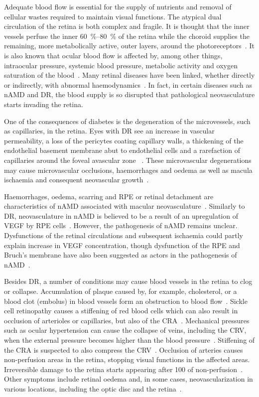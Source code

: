 \documentclass{article}
\begin{document}
Adequate blood flow is essential for the supply of nutrients and removal of cellular wastes required to maintain visual functions.
The atypical dual circulation of the retina is both complex and fragile.
It is thought that the inner vessels perfuse the inner \SIrange{60}{80}{\percent} of the retina while the choroid supplies the remaining, more metabolically active, outer layers, around the photoreceptors~\cite{Birol_2007}.
It is also known that ocular blood flow is affected by, among other things, intraocular pressure, systemic blood pressure, metabolic activity and oxygen saturation of the blood~\cite{Birol_2007,McCullough_1997,Palkovits_2014,Polska_2007,Pournaras_2008,Riva_1997,Wang_2014}.
Many retinal diseases have been linked, whether directly or indirectly, with abnormal haemodynamics~\cite{Hayreh_2004,Medina_2016}.
In fact, in certain diseases such as nAMD and DR, the blood supply is so disrupted that pathological neovasculature starts invading the retina.

One of the consequences of diabetes is the degeneration of the microvessels, such as capillaries, in the retina.
Eyes with DR see an increase in vascular permeability, a loss of the pericytes coating capillary walls, a thickening of the endothelial basement membrane abut to endothelial cells and a rarefaction of capillaries around the foveal avascular zone ~\cite{Medina_2016}.
These microvascular degenerations may cause microvascular occlusions, haemorrhages and oedema as well as macula ischaemia and consequent neovascular growth~\cite{Medina_2016}.

Haemorrhages, oedema, scarring and RPE or retinal detachment are characteristics of nAMD associated with macular neovasculature~\cite{Gupta_2015,Jager_2008}.
Similarly to DR, neovasculature in nAMD is believed to be a result of an upregulation of VEGF by RPE cells~\cite{Jager_2008}.
However, the pathogenesis of nAMD remains unclear.
Dysfunctions of the retinal circulations and subsequent ischaemia could partly explain increase in VEGF concentration, though dysfunction of the RPE and Bruch's membrane have also been suggested as actors in the pathogenesis of nAMD~\cite{Ambati_and_Fowler_2012,Pemp_2008,Liu_1995}.

Besides DR, a number of conditions may cause blood vessels in the retina to clog or collapse.
Accumulation of plaque caused by, for example, cholesterol, or a blood clot (embolus) in blood vessels form an obstruction to blood flow~\cite{Medina_2016}.
Sickle cell retinopathy causes a stiffening of red blood cells which can also result in occlusion of arterioles or capillaries, but also of the CRA~\cite{Medina_2016}.
Mechanical pressures such as ocular hypertension can cause the collapse of veins, including the CRV, when the external pressure becomes higher than the blood pressure~\cite{Hayreh_2004}.
Stiffening of the CRA is suspected to also compress the CRV~\cite{Medina_2016}.
Occlusion of arteries causes non-perfusion areas in the retina, stopping visual functions in the affected areas.
Irreversible damage to the retina starts appearing after \SI{100}{\min} of non-perfusion~\cite{Hayreh_2004}.
Other symptoms include retinal oedema and, in some cases, neovascularization in various locations, including the optic disc and the retina~\cite{Medina_2016}.
\end{document}
